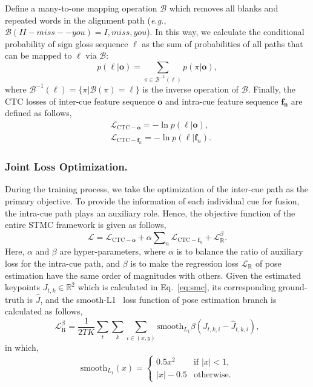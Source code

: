 \documentclass[letterpaper]{article} \usepackage{aaai20}  \usepackage{times}  \usepackage{helvet} \usepackage{courier}  \usepackage[hyphens]{url}  \usepackage{graphicx} \urlstyle{rm} \def\UrlFont{\rm}  \usepackage{graphicx}  \frenchspacing  \setlength{\pdfpagewidth}{8.5in}  \setlength{\pdfpageheight}{11in}
\def\lbf{{\boldsymbol\ell}}
\begin{document}
Define a many-to-one mapping operation $\mathcal{B}$ which removes all blanks and repeated words in the alignment path (\emph{e.g.}, $\mathcal{B}(II-miss--you)=I,miss,you$). In this way, we calculate the conditional probability of sign gloss sequence $\lbf$ as the sum of probabilities of all paths that can be mapped to $\lbf$ via $\mathcal{B}$:
\begin{equation}
    p(\lbf | \mathbf{o}) = \sum_{\pi \in \mathcal{B}^{-1}(\lbf)}  p(\pi | \mathbf{o}),
\end{equation}
where \(\mathcal{B}^{-1}(\lbf)\!=\!\{\pi | \mathcal{B}(\pi)\!=\!\lbf\}\) is the inverse operation of \(\mathcal{B}\). Finally, the CTC losses of inter-cue feature sequence $\mathbf{o}$ and intra-cue feature sequence $\mathbf{f_n}$ are defined as follows,
\begin{align}
    &\mathcal{L}_{\text{CTC}-\mathbf{o}} = -\ln{p(\lbf | \mathbf{o})}, \\
    &\mathcal{L}_{\text{CTC}-\mathbf{f}_n} = -\ln{p(\lbf | \mathbf{f}_n)}.
\end{align}


\subsubsection{Joint Loss Optimization.}
During the training process, we take the optimization of the inter-cue path as the primary objective. To provide the information of each individual cue for fusion, the intra-cue path plays an auxiliary role. Hence, the objective function of the entire STMC framework is given as follows,
\begin{equation} \label{eq:joint_loss}
    \mathcal{L} = \mathcal{L}_{\text{CTC}-\mathbf{o}}+\alpha \sum\nolimits_{n}{\mathcal{L}_{\text{CTC}-\mathbf{f}_n}} + \mathcal{L}_{\text{R}}^{\beta}.
\end{equation} 
Here, $\alpha$ and $\beta$ are hyper-parameters, where $\alpha$ is to balance the ratio of auxiliary loss for the intra-cue path, and $\beta$ is to make the regression loss $\mathcal{L}_{\text{R}}$ of pose estimation have the same order of magnitudes with others. 
Given the estimated keypoints $J_{t,k}\in\mathbb{R}^2$ which is calculated in Eq.~\ref{eq:smc}, its corresponding ground-truth is $\hat{J}$, and the smooth-L1~\cite{girshick2015fast} loss function of pose estimation branch is calculated as follows,
\begin{equation}
    \mathcal{L}_{\text{R}}^{\beta} = \frac{1}{2T\!K} \sum_t \sum_k \sum_{i\in(x,y)}  \text{smooth}_{L_1}\beta( J_{t,k,i}- \hat{J}_{t,k,i}),
\end{equation}
in which,
\begin{align}
    \text{smooth}_{L_1}(x) = \begin{cases}
          0.5 x^2  &\text{if $|x|<1$,} \\
          |x|-0.5  &\text{otherwise.}      
        \end{cases} 
\end{align}
\end{document}
